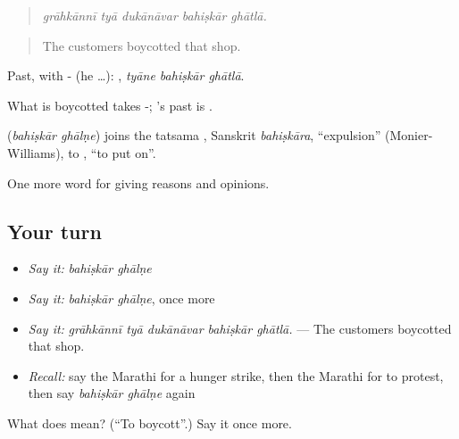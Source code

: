 \begin{quote}
\emph{grāhkānnī tyā dukānāvar bahiṣkār ghātlā.}
\end{quote}

\begin{quote}
The customers boycotted that shop.
\end{quote}

Past, with - (he …):   , \emph{tyāne bahiṣkār ghātlā}.

What is boycotted takes -; 's past is .

\begin{cousinweb}
\textbf{ } (\emph{bahiṣkār ghālṇe}) joins the tatsama , Sanskrit \emph{bahiṣkāra}, \textquotedblleft{}expulsion\textquotedblright{} (Monier-Williams), to , \textquotedblleft{}to put on\textquotedblright{}.
\end{cousinweb}

\begin{grammarlens}[title={What you've built}]
One more word for giving reasons and opinions.
\end{grammarlens}

\subsection*{Your turn}
\begin{itemize}
\raggedright
  \item \emph{Say it:} \emph{bahiṣkār ghālṇe}
  \item \emph{Say it:} \emph{bahiṣkār ghālṇe}, once more
  \item \emph{Say it:} \emph{grāhkānnī tyā dukānāvar bahiṣkār ghātlā.} — The customers boycotted that shop.
  \item \emph{Recall:} say the Marathi for a hunger strike, then the Marathi for to protest, then say \emph{bahiṣkār ghālṇe} again
\end{itemize}

\begin{tcolorbox}[breakable,colback=teal!4,colframe=teal!35!black,title={Before you move on}]
What does   mean? (\textquotedblleft{}To boycott\textquotedblright{}.) Say it once more.
\end{tcolorbox}
